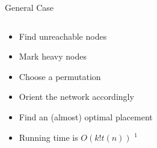 \begin{frame}{General Case}

\begin{columns}
\begin{column}{0.65\textwidth}
\begin{itemize}[<+>]
\item Find unreachable nodes
\item Mark heavy nodes
\item Choose a permutation
\item Orient the network accordingly 
\item Find an (almost) optimal placement
\item Running time is $O(k!t(n))$ $^1$ 
\end{itemize}

\end{column}
\begin{column}{0.4\textwidth}
\begin{center}

\end{center}
\end{column}
\end{columns}

\end{frame}